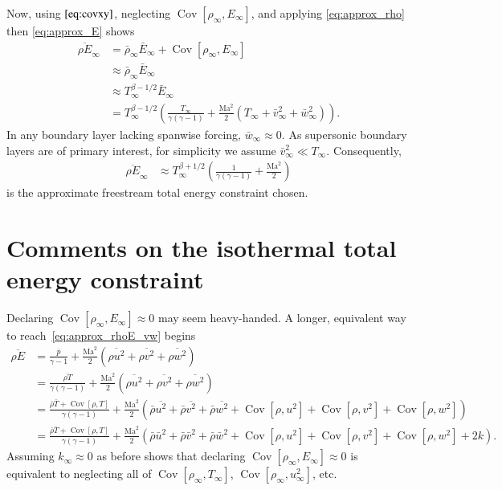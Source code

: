 \documentclass[letterpaper,11pt,nointlimits,reqno]{amsart}
\newcommand{\Mach}[1][]{\mbox{Ma}_{#1}}
\newcommand{\Cov}[2]{\ensuremath{\operatorname{Cov}\left[{#1},{#2}\right]}}
\begin{document}
Now, using $\eqref{eq:covxy}$, neglecting $\Cov{\rho_\infty}{E_\infty}$, and
applying \eqref{eq:approx_rho} then \eqref{eq:approx_E} shows
\begin{align}
  \overline{\rho E}_\infty
  &=
  \bar{\rho}_\infty \bar{E}_\infty + \Cov{\rho_\infty}{E_\infty}
\\
  &\approx \bar{\rho}_\infty \bar{E}_\infty
\\
  &\approx T_\infty^{\beta-1/2} \bar{E}_\infty
\\
  \label{eq:approx_rhoE_vw}
  &=
  T_\infty^{\beta-1/2} \left(
      \frac{T_\infty}{\gamma\left( \gamma-1 \right)}
    + \frac{\Mach^2}{2}\left(T_\infty+\bar{v}^2_\infty+\bar{w}^2_\infty\right)
  \right)
.
\end{align}
In any boundary layer lacking spanwise forcing, $\bar{w}_\infty\approx{}0$.  As
supersonic boundary layers are of primary interest, for simplicity we assume
$\bar{v}_\infty^2 \ll T_\infty$.  Consequently,
\begin{align}
  \label{eq:approx_rhoE}
  \overline{\rho E}_\infty
  &\approx
  T_\infty^{\beta+1/2} \left(
      \frac{1}{\gamma\left(\gamma-1\right)}
    + \frac{\Mach^2}{2}
  \right)
\end{align}
is the approximate freestream total energy constraint chosen.

\section{Comments on the isothermal total energy constraint}

Declaring $\Cov{\rho_\infty}{E_\infty} \approx 0$ may seem heavy-handed.  A
longer, equivalent way to reach~\eqref{eq:approx_rhoE_vw} begins
\begin{align}
  \overline{\rho E}
&=
    \frac{\bar{p}}{\gamma-1}
  + \frac{\Mach^2}{2}\left(
        \overline{\rho u^2}
      + \overline{\rho v^2}
      + \overline{\rho w^2}
    \right)
\\
&=
    \frac{\overline{\rho T}}{\gamma\left(\gamma-1\right)}
  + \frac{\Mach^2}{2}\left(
        \overline{\rho u^2}
      + \overline{\rho v^2}
      + \overline{\rho w^2}
    \right)
\\
&=
    \frac{\bar{\rho}\bar{T} + \Cov{\rho}{T}}
         {\gamma\left(\gamma-1\right)}
  + \frac{\Mach^2}{2}\left(
        \bar{\rho} \overline{u^2}
      + \bar{\rho} \overline{v^2}
      + \bar{\rho} \overline{w^2}
      + \Cov{\rho}{u^2}
      + \Cov{\rho}{v^2}
      + \Cov{\rho}{w^2}
    \right)
\\
&=
    \frac{\bar{\rho}\bar{T} + \Cov{\rho}{T}}
         {\gamma\left(\gamma-1\right)}
  + \frac{\Mach^2}{2}\left(
        \bar{\rho} \bar{u}^2
      + \bar{\rho} \bar{v}^2
      + \bar{\rho} \bar{w}^2
      + \Cov{\rho}{u^2}
      + \Cov{\rho}{v^2}
      + \Cov{\rho}{w^2}
      + 2 k
    \right)
.
\end{align}
Assuming $k_\infty \approx 0$ as before shows that declaring
$\Cov{\rho_\infty}{E_\infty} \approx 0$ is equivalent to neglecting all of
$\Cov{\rho_\infty}{T_\infty}$, $\Cov{\rho_\infty}{u^2_\infty}$, etc.
\end{document}
